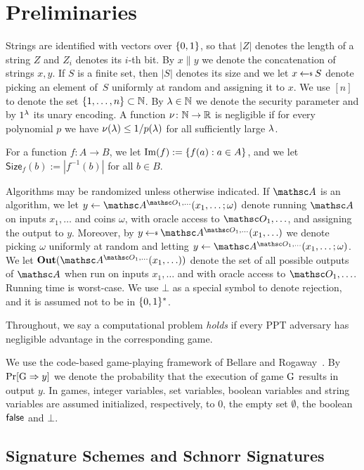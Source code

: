 \section{Preliminaries}\label{sec-prelims}

 Strings are identified with vectors over $\{0,1\}$, so that $|Z|$ denotes the length of a string $Z$ and $Z_i$ denotes its $i$-th bit. By $x\|y$ we denote the concatenation of strings $x,y$. If $S$ is a finite set, then $|S|$ denotes its size and we let $x \getsr S$ denote picking an element of~$S$ uniformly at random and assigning it to $x$. We use $[n]$ to denote the set $\{1, \dots, n\} \subset \mathbb N$. By $\lambda \in \mathbb N$ we denote the security parameter and by $1^{\lambda}$ its unary encoding. A function $\nu \colon \mathbb N \to \mathbb R$ is negligible if for every polynomial $p$ we have $\nu(\lambda) \le 1/p(\lambda)$ for all sufficiently large $\lambda$.

For a function $f \colon A \to B$, we let $\mathrm{Im}(f) := \{f(a) : a \in A\}$, and we let $\mathsf{Size}_f(b) := |f^{-1}(b)|$ for all $b \in B$.

Algorithms may be randomized unless otherwise indicated. If $\advA$ is an algorithm, we let $y\gets \advA^{\procfont{O}_1,\ldots}(x_1,\ldots ; \omega)$ denote running $\advA$ on inputs $x_1,\ldots$ and coins $\omega$, with oracle access to $\procfont{O}_1,\ldots$, and assigning the output to $y$. Moreover, by $y\getsr \advA^{\procfont{O}_1,\ldots}(x_1,\ldots)$ we denote picking $\omega$ uniformly at random and letting $y\gets \advA^{\procfont{O}_1,\ldots}(x_1,\ldots ; \omega)$. We let $\OutSet{\advA^{\procfont{O}_1,\ldots}(x_1,\ldots)}$ denote the set of all possible outputs of $\advA$ when run on inputs $x_1,\ldots$ and with oracle access to $\procfont{O}_1,\ldots$. Running time is worst-case. We use $\bot$ as a special symbol to denote rejection, and it is assumed not to be in $\{0,1\}^*$.

Throughout, we say a computational problem \emph{holds} if every PPT adversary has negligible advantage in the corresponding game.

 We use the code-based game-playing framework of Bellare and Rogaway~\cite{EC:BelRog06}. By $\Pr[\textnormal{G}\Rightarrow y]$ we denote the probability that the execution of game $\textnormal{G}$ results in output $y$. In games, integer variables, set variables, boolean variables and string variables are assumed initialized, respectively, to $0$, the empty set $\emptyset$, the boolean $\mathsf{false}$ and $\bot$.

\subsection{Signature Schemes and Schnorr Signatures} \label{sec-schnorr}

